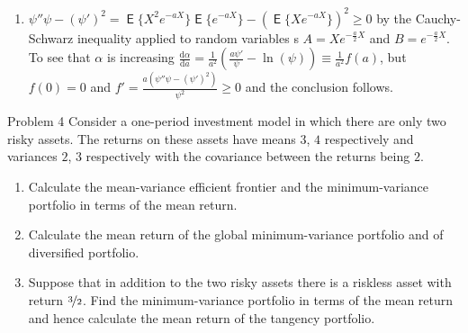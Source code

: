 \documentclass[10pt,handout]{beamer}
\newcommand{\ds}{\displaystyle}
\DeclareMathOperator\expc{\mathsf{E}}
\theoremstyle{definition}
\begin{document}
\begin{frame}[allowframebreaks]
\begin{enumerate}
    \item $\ds\psi''\psi - (\psi')^2 = \expc\big\{X^2e^{-aX}\big\}\expc\big\{e^{-aX}\big\} - (\expc\big\{Xe^{-aX}\big\})^2 \geqslant 0$
      by the Cauchy-Schwarz inequality applied to random variables s $\ds A = Xe^{-\frac{a}{2}X}$ and $\ds B = e^{-\frac{a}{2}X}$. To see that $\alpha$ is increasing $\ds\frac{\text{d}\alpha}{\text{d}a} = \frac{1}{a^2}\left(\frac{a\psi'}{\psi} - \ln (\psi)\right)\equiv\frac{1}{a^2}f(a)$, but $f(0) = 0$ and $\ds f' = \frac{a(\psi''\psi - (\psi')^2)}{\psi^2}\geqslant 0$ and the conclusion follows.
  \end{enumerate}
\end{frame}

\begin{frame}{Problem 4}
  Consider a one-period investment model in which there are only two risky assets. The returns on these assets have means $3$, $4$ respectively and variances $2$, $3$ respectively with the covariance between the returns being $2$.
  \begin{enumerate}
    \item Calculate the mean-variance efficient frontier and the minimum-variance portfolio in terms of the mean return.
    \item Calculate the mean return of the global minimum-variance portfolio and of diversified portfolio.
    \item Suppose that in addition to the two risky assets there is a riskless asset with return $\nicefrac{3}{2}$. Find the minimum-variance portfolio in terms of the mean return and hence calculate the mean return of the tangency portfolio.
  \end{enumerate}
\end{frame}
\end{document}
